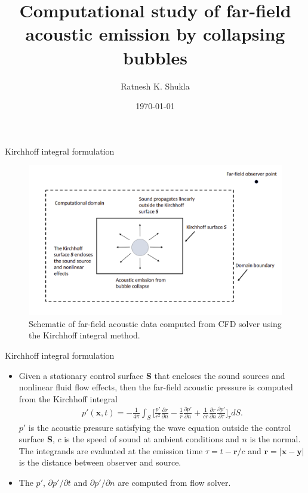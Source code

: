 \documentclass[10pt, aspectratio=169]{beamer}
\title{Computational study of far-field acoustic emission by collapsing bubbles}
\date{\today}
\author[shortname]{Ratnesh K. Shukla}
\institute[shortinst]{Indian Institute of Science, Bangalore}
\begin{document}
\begin{frame}
	\maketitle
\end{frame}

\begin{frame}{Kirchhoff integral formulation}
	\begin{figure}
		\centering
		\includegraphics[scale=0.23]{images/shematic.png}
		\caption{Schematic of far-field acoustic data computed from CFD solver using the Kirchhoff integral method.}
	\end{figure}
\end{frame}

\begin{frame}{Kirchhoff integral formulation}
	\begin{itemize}
		\item Given a stationary control surface \textbf{S} that encloses the sound sources and nonlinear fluid flow effects, then the far-field acoustic pressure is computed from the Kirchhoff integral 
		\begin{equation}
			\begin{split}
				p'(\mathbf{x}, t) = -\frac{1}{4\pi}\int_{S}\Big[  \frac{p'}{r^{2}}\frac{\partial r}{\partial n} - \frac{1}{r}\frac{\partial p'}{\partial n} + \frac{1}{c r}\frac{\partial r}{\partial n}\frac{\partial p'}{\partial \tau} \Big]_{\tau} dS.
			\end{split} 
		\end{equation}
		$p'$ is the acoustic pressure satisfying the wave equation outside the control surface \textbf{S}, $c$ is the speed of sound at ambient conditions and $n$ is the normal.
		The integrands are evaluated at the emission time $\tau = t - \mathbf{r}/c$ and $\mathbf{r}= |\mathbf{x} - \mathbf{y}|$ is the distance between observer and source.
		\item The $p'$, ${\partial p'}/{\partial t}$ and ${\partial p'}/{\partial n}$ are computed from flow solver.
	\end{itemize}
\end{frame}
\end{document}
